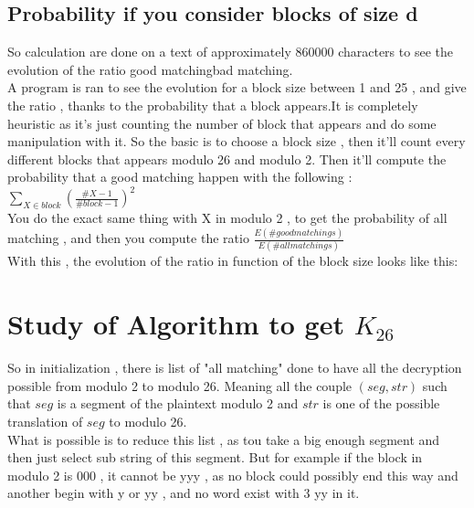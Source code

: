 \documentclass{article}
\begin{document}
\subsection{Probability if you consider blocks of size d}
So calculation are done on a text of approximately $860000$ characters to see the evolution of the ratio good matching\/bad matching.\\
A program is ran to see the evolution for a block size between 1 and 25 , and give the ratio , thanks to the probability that a block appears.It is completely heuristic as it's just counting the number of block that appears and do some manipulation with it.
So the basic is to choose a block size , then it'll count every different blocks that appears modulo 26 and modulo 2.
Then it'll compute the probability that a good matching happen with the following : $\sum_{X \in block}({\frac{\#X -1}{\#block -1}})^2 $\\
You do the exact same thing with X in modulo 2 , to get the probability of all matching , and then you compute the ratio $\frac{E(\# good matchings)}{E(\# all matchings)}$\\
With this , the evolution of the ratio in function of the block size looks like this:\\

\section{Study of Algorithm to get $K_{26}$}
So in initialization , there is list of "all matching" done to have all the decryption possible from modulo 2 to modulo 26. Meaning all the couple $(seg,str)$ such that $seg$ is a segment of the plaintext modulo 2 and $str$ is one of the possible translation of $seg$ to modulo 26.\\
What is possible is to reduce this list , as tou take a big enough segment and then just select sub string of this segment. But for example if the block in modulo 2 is 000 , it cannot be yyy , as no block could possibly end this way and another begin with y or yy , and no word exist with 3 yy in it.\\
\end{document}
